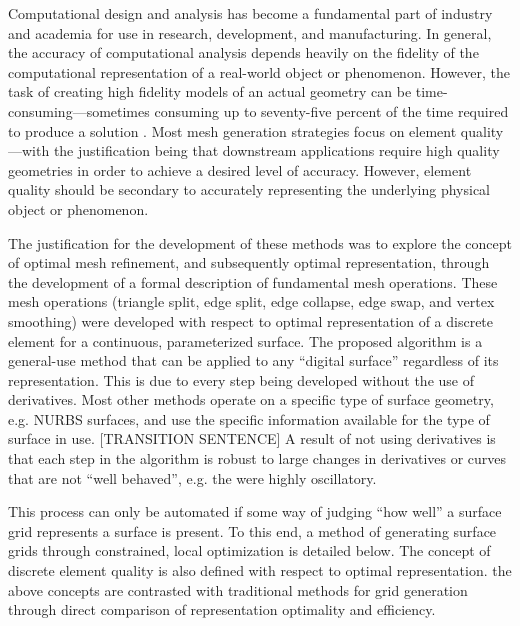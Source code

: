 Computational design and analysis has become a fundamental part of
industry and academia for use in research, development, and
manufacturing. In general, the accuracy of computational analysis
depends heavily on the fidelity of the computational representation of a
real-world object or phenomenon. However, the task of creating high
fidelity models of an actual geometry can be time-consuming---sometimes
consuming up to seventy-five percent of the time required to produce a
solution \cite{bischoff05}. Most mesh generation strategies focus on
element quality---with the justification being that downstream
applications require high quality geometries in order to achieve a
desired level of accuracy. However, element quality should be secondary
to accurately representing the underlying physical object or phenomenon.

The justification for the development of these methods was to explore
the concept of optimal mesh refinement, and subsequently optimal
representation, through the development of a formal description of
fundamental mesh operations. These mesh operations (triangle split, edge
 split, edge collapse, edge swap, and vertex smoothing) were
developed with respect to optimal representation of a discrete element
for a continuous, parameterized surface. The proposed algorithm is a
general-use method that can be applied to any ``digital surface''
regardless of its representation. This is due to every step being
developed without the use of derivatives. Most other methods operate on
a specific type of surface geometry, e.g. NURBS surfaces, and use the
specific information available for the type of surface in use.
[TRANSITION SENTENCE] A result of not using derivatives is that each
step in the algorithm is robust to large changes in derivatives or
curves that are not ``well behaved'', e.g. the were highly oscillatory.

This process can only be automated if some way of judging ``how well'' a
surface grid represents a surface is present. To this end, a method of
generating surface grids through constrained, local optimization is
detailed below. The concept of discrete element quality is also defined
with respect to optimal representation. the above concepts are
contrasted with traditional methods for grid generation through direct
comparison of representation optimality and efficiency.



